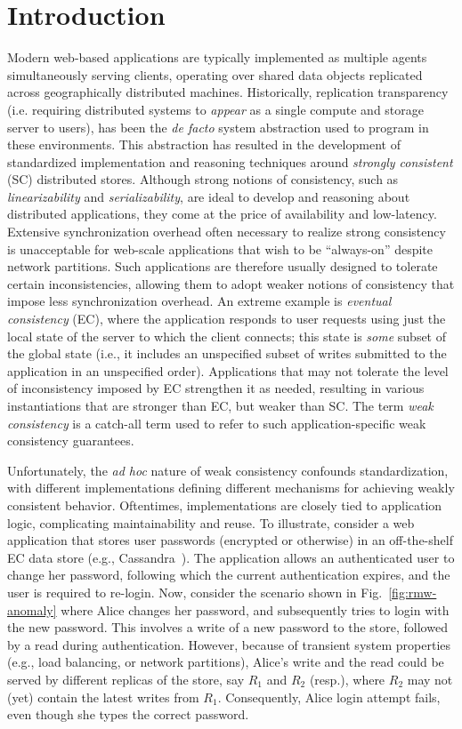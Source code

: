 \section{Introduction}
\label{sec:intro}

Modern web-based applications are typically implemented as multiple
agents simultaneously serving clients, operating over shared data
objects replicated across geographically distributed machines.
Historically, replication transparency (i.e. requiring distributed
systems to \emph{appear} as a single compute and storage server to
users), has been the \emph{de facto} system abstraction used to
program in these environments.  This abstraction has resulted in the
development of standardized implementation and reasoning techniques
around \emph{strongly consistent} (SC) distributed stores.  Although
strong notions of consistency, such as \emph{linearizability} and
\emph{serializability}, are ideal to develop and reasoning about
distributed applications, they come at the price of availability and
low-latency.  Extensive synchronization overhead often necessary to
realize strong consistency is unacceptable for web-scale applications
that wish to be ``always-on'' despite network partitions.  Such
applications are therefore usually designed to tolerate certain
inconsistencies, allowing them to adopt weaker notions of consistency
that impose less synchronization overhead. An extreme example is
\emph{eventual consistency} (EC), where the application responds to
user requests using just the local state of the server to which the
client connects; this state is \emph{some} subset of the global state
(i.e., it includes an unspecified subset of writes submitted to the
application in an unspecified order).  Applications that may not
tolerate the level of inconsistency imposed by EC strengthen it as
needed, resulting in various instantiations that are stronger than EC,
but weaker than SC. The term \emph{weak consistency} is a catch-all
term used to refer to such application-specific weak consistency
guarantees.

Unfortunately, the \emph{ad hoc} nature of weak consistency confounds
standardization, with different implementations defining different
mechanisms for achieving weakly consistent behavior.  Oftentimes,
implementations are closely tied to application logic, complicating
maintainability and reuse.  To illustrate, consider a web application
that stores user passwords (encrypted or otherwise) in an
off-the-shelf EC data store (e.g., Cassandra~\cite{cassandra}). The
application allows an authenticated user to change her password,
following which the current authentication expires, and the user is
required to re-login.  Now, consider the scenario shown in
Fig.~\ref{fig:rmw-anomaly} where Alice changes her password, and
subsequently tries to login with the new password. This involves a
write of a new password to the store, followed by a read during
authentication.  However, because of transient system properties
(e.g., load balancing, or network partitions), Alice's write and the
read could be served by different replicas of the store, say $R_1$ and
$R_2$ (resp.), where $R_2$ may not (yet) contain the latest writes
from $R_1$. Consequently, Alice login attempt fails, even though she
types the correct password.

